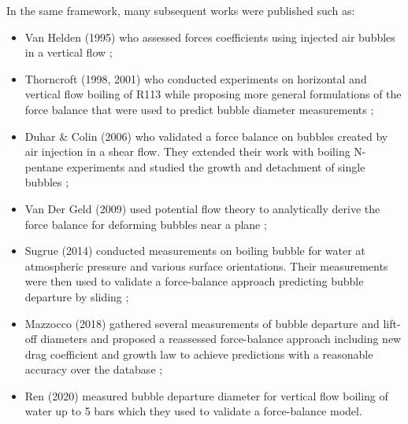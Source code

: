 \npar

In the same framework, many subsequent works were published such as:

\begin{itemize}
\item Van Helden \etal \cite{van_helden_forces_1995} (1995) who assessed forces coefficients using injected air bubbles in a vertical flow ;

\item Thorncroft \etal \cite{thorncroft_experimental_1998, thorncroft_bubble_2001} (1998, 2001) who conducted experiments on horizontal and vertical flow boiling of R113 while proposing more general formulations of the force balance that were used to predict bubble diameter measurements ;

\item Duhar \& Colin \cite{duhar_dynamics_2006} (2006) who validated a force balance on bubbles created by air injection in a shear flow. They extended their work with boiling N-pentane experiments and studied the growth and detachment of single bubbles  \cite{duhar_vapour_2009} ;

\item Van Der Geld (2009) \cite{van_der_geld_dynamics_2009} used potential flow theory to analytically derive the force balance for deforming bubbles near a plane ;

\item Sugrue \etal (2014) \cite{sugrue_experimental_2014} conducted measurements on boiling bubble for water at atmospheric pressure and various surface orientations. Their measurements were then used to validate a force-balance approach predicting bubble departure by sliding \cite{sugrue_modified_2016} ;

\item Mazzocco \etal (2018) \cite{mazzocco_reassessed_2018} gathered several measurements of bubble departure and lift-off diameters and proposed a reassessed force-balance approach including new drag coefficient and growth law to achieve predictions with a reasonable accuracy over the database ;

\item Ren \etal (2020) \cite{ren_development_2020} measured bubble departure diameter for vertical flow boiling of water up to 5 bars which they used to validate a force-balance model.
\end{itemize}

